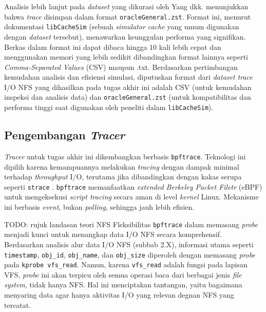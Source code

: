 Analisis lebih lanjut pada \textit{dataset} yang dikurasi oleh Yang dkk. menunjukkan bahwa \textit{trace} disimpan dalam format \texttt{oracleGeneral.zst}. Format ini, menurut dokumentasi \texttt{libCacheSim} (sebuah \textit{simulator cache} yang umum digunakan dengan \textit{dataset} tersebut), menawarkan keunggulan performa yang signifikan. Berkas dalam format ini dapat dibaca hingga 10 kali lebih cepat dan menggunakan memori yang lebih sedikit dibandingkan format lainnya seperti \textit{Comma-Separated Values} (CSV) maupun .txt. Berdasarkan pertimbangan kemudahan analisis dan efisiensi simulasi, diputuskan format dari \textit{dataset trace} I/O NFS yang dihasilkan pada tugas akhir ini adalah CSV (untuk kemudahan inspeksi dan analisis data) dan \texttt{oracleGeneral.zst} (untuk kompatibilitas dan performa tinggi saat digunakan oleh peneliti dalam \texttt{libCacheSim}).

\subsection{Pengembangan \textit{Tracer}}
\textit{Tracer} untuk tugas akhir ini dikembangkan berbasis \texttt{bpftrace}. Teknologi ini dipilih karena kemampuannya melakukan \textit{tracing} dengan dampak minimal terhadap \textit{throughput} I/O, terutama jika dibandingkan dengan kakas serupa seperti \texttt{strace} \parencite{TracerFile}. \texttt{bpftrace} memanfaatkan \textit{extended Berkeley Packet Filetr} (eBPF) untuk mengeksekusi \textit{script tracing} secara aman di level \textit{kernel} Linux. Mekanisme ini berbasis \textit{event}, bukan \textit{polling}, sehingga jauh lebih efisien.

TODO: rujuk landasan teori NFS
Fleksibilitas \texttt{bpftrace} dalam memasang \textit{probe} menjadi kunci untuk menangkap data I/O NFS secara komprehensif. Berdasarkan analisis alur data I/O NFS (subbab 2.X), informasi utama seperti \texttt{timestamp}, \texttt{obj\_id}, \texttt{obj\_name}, dan \texttt{obj\_size} diperoleh dengan memasang \textit{probe} pada \texttt{kprobe vfs\_read}. Namun, karena \texttt{vfs\_read} adalah fungsi pada lapisan VFS, \textit{probe} ini akan terpicu oleh semua operasi baca dari berbagai jenis \textit{file system}, tidak hanya NFS. Hal ini menciptakan tantangan, yaitu bagaimana menyaring data agar hanya aktivitas I/O yang relevan degnan NFS yang tercatat.

